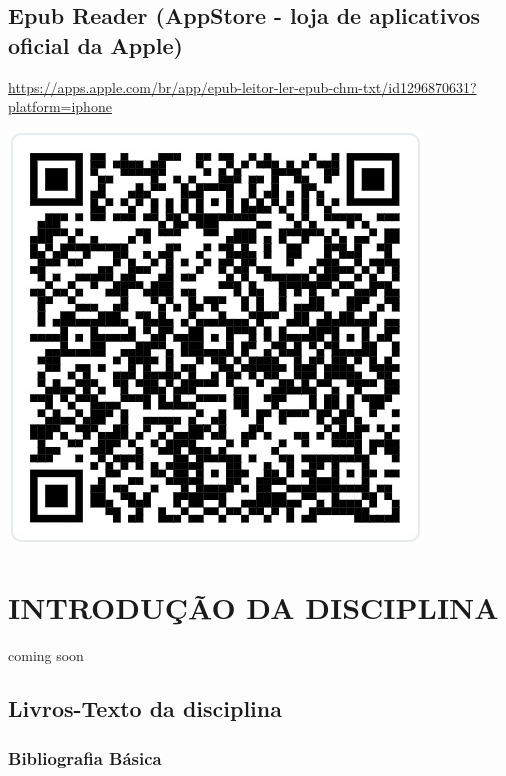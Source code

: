 \documentclass[
]{book}
\begin{document}
\section{\texorpdfstring{\textbf{Epub Reader (AppStore - loja de aplicativos oficial da Apple)}}{Epub Reader (AppStore - loja de aplicativos oficial da Apple)}}\label{epub-reader-appstore---loja-de-aplicativos-oficial-da-apple}

\url{https://apps.apple.com/br/app/epub-leitor-ler-epub-chm-txt/id1296870631?platform=iphone}

\includegraphics{images/qr-code/leitor_ebook/AppleEpubReader.jpg}

\chapter*{INTRODUÇÃO DA DISCIPLINA}\label{introduuxe7uxe3o-da-disciplina}

coming soon

\section{Livros-Texto da disciplina}\label{livros-texto-da-disciplina}

\subsection{Bibliografia Básica}\label{bibliografia-buxe1sica}
\end{document}
